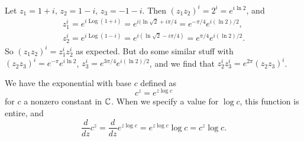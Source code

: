  \begin{example}
     Let $z_1=1+i,\,z_2=1-i,\,z_3=-1-i$. Then $(z_1z_2)^{i}=2^i=e^{i \ln 2}$, and 
     \begin{gather*}
         z_1^{i}=e^{i\operatorname{Log}(1+i)}=e^{i(\ln\sqrt{2} +i\pi /4}=e^{-\pi /4}e^{i(\ln 2) /2},\\
         z_2^i=e^{i\operatorname{Log}(1-i)}=e^{i(\ln\sqrt{2} -i\pi /4)}=e^{\pi /4}e^{i(\ln 2) /2}.
     \end{gather*}
     So $(z_1z_2)^i=z_1^{i}z_2^i$ as expected. But do some similar stuff with $(z_2z_3)^i=e^{-\pi}e^{i\ln2}$, $z_3^i=e^{3\pi /4}e^{i(\ln 2) /2}$, and we find that $z_2^iz_3^i=e^{2\pi}(z_2z_3)^i$.
 \end{example}
We have the exponential with base $c$ defined as \[
c^{z}=e^{z\log c}
\] for $c$ a nonzero constant in $\mathbb{C}$. When we specify a value for $\log c$, this function is entire, and \[
\frac{d}{dz}c^{z}=\frac{d}{dz}e^{z\log c}=e^{z \log c}\log c=c^{z}\log c.
\] 
 
 
